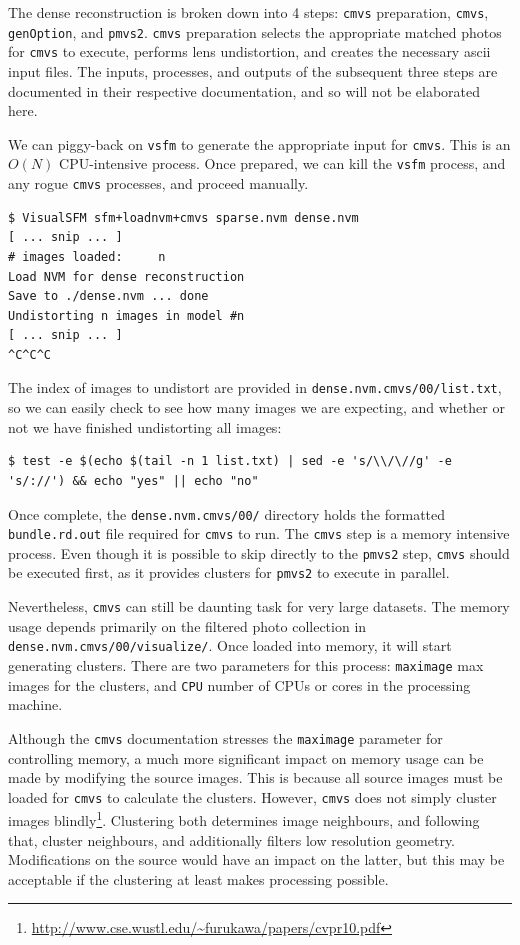 \documentclass{article}
\begin{document}
The dense reconstruction is broken down into 4 steps: {\tt cmvs} preparation, {\tt cmvs}, {\tt genOption}, and {\tt pmvs2}. {\tt cmvs} preparation selects the appropriate matched photos for {\tt cmvs} to execute, performs lens undistortion, and creates the necessary ascii input files. The inputs, processes, and outputs of the subsequent three steps are documented in their respective documentation, and so will not be elaborated here.

We can piggy-back on {\tt vsfm} to generate the appropriate input for {\tt cmvs}. This is an $O(N)$ CPU-intensive process. Once prepared, we can kill the {\tt vsfm} process, and any rogue {\tt cmvs} processes, and proceed manually.

\begin{lstlisting}
$ VisualSFM sfm+loadnvm+cmvs sparse.nvm dense.nvm
[ ... snip ... ]
# images loaded:     n
Load NVM for dense reconstruction
Save to ./dense.nvm ... done
Undistorting n images in model #n
[ ... snip ... ]
^C^C^C
\end{lstlisting}

The index of images to undistort are provided in {\tt dense.nvm.cmvs/00/list.txt}, so we can easily check to see how many images we are expecting, and whether or not we have finished undistorting all images:

\begin{lstlisting}
$ test -e $(echo $(tail -n 1 list.txt) | sed -e 's/\\/\//g' -e 's/://') && echo "yes" || echo "no"
\end{lstlisting}

Once complete, the {\tt dense.nvm.cmvs/00/} directory holds the formatted {\tt bundle.rd.out} file required for {\tt cmvs} to run. The {\tt cmvs} step is a memory intensive process. Even though it is possible to skip directly to the {\tt pmvs2} step, {\tt cmvs} should be executed first, as it provides clusters for {\tt pmvs2} to execute in parallel.

Nevertheless, {\tt cmvs} can still be daunting task for very large datasets. The memory usage depends primarily on the filtered photo collection in {\tt dense.nvm.cmvs/00/visualize/}. Once loaded into memory, it will start generating clusters. There are two parameters for this process: {\tt maximage} max images for the clusters, and {\tt CPU} number of CPUs or cores in the processing machine.

Although the {\tt cmvs} documentation stresses the {\tt maximage} parameter for controlling memory, a much more significant impact on memory usage can be made by modifying the source images. This is because all source images must be loaded for {\tt cmvs} to calculate the clusters. However, {\tt cmvs} does not simply cluster images blindly\footnote{\url{http://www.cse.wustl.edu/~furukawa/papers/cvpr10.pdf}}. Clustering both determines image neighbours, and following that, cluster neighbours, and additionally filters low resolution geometry. Modifications on the source would have an impact on the latter, but this may be acceptable if the clustering at least makes processing possible.
\end{document}

